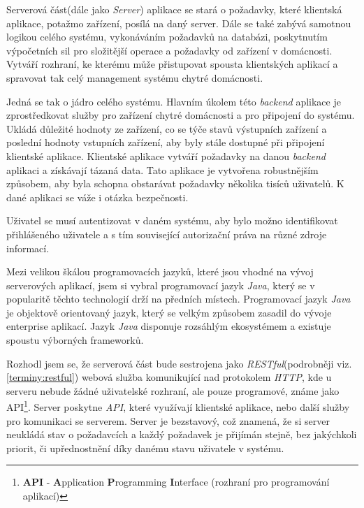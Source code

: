 Serverová část(dále jako \emph{Server}) aplikace se stará o požadavky, které klientská aplikace, potažmo zařízení, posílá na daný server.
Dále se také zabývá samotnou logikou celého systému, vykonáváním požadavků na databázi, poskytnutím výpočetních sil pro složitější operace a požadavky od zařízení v domácnosti.
Vytváří rozhraní, ke kterému může přistupovat spousta klientských aplikací a spravovat tak celý management systému chytré domácnosti.

Jedná se tak o jádro celého systému.
Hlavním úkolem této \emph{backend} aplikace je zprostředkovat služby pro zařízení chytré domácnosti a pro připojení do systému.
Ukládá důležité hodnoty ze zařízení, co se týče stavů výstupních zařízení a poslední hodnoty vstupních zařízení, aby byly stále dostupné při připojení klientské aplikace.
Klientské aplikace vytváří požadavky na danou \emph{backend} aplikaci a získávají tázaná data.
Tato aplikace je vytvořena robustnějším způsobem, aby byla schopna obstarávat požadavky několika tisíců uživatelů.
K dané aplikaci se váže i otázka bezpečnosti.

Uživatel se musí autentizovat v daném systému, aby bylo možno identifikovat přihlášeného uživatele a s tím související autorizační práva na různé zdroje informací.

Mezi velikou škálou programovacích jazyků, které jsou vhodné na vývoj serverových aplikací, jsem si vybral programovací jazyk \emph{Java},
který se v popularitě těchto technologií drží na předních místech. Programovací jazyk \emph{Java} je objektově orientovaný jazyk, který se velkým způsobem zasadil do vývoje enterprise aplikací.
Jazyk \emph{Java} disponuje rozsáhlým ekosystémem a existuje spoustu výborných frameworků.

Rozhodl jsem se, že serverová část bude sestrojena jako \emph{RESTful}(podrobněji viz. \ref{terminy:restful}) webová služba komunikující nad protokolem \emph{HTTP},
kde u serveru nebude žádné uživatelské rozhraní, ale pouze programové, známe jako API\footnote{\textbf{API} - \textbf{A}pplication \textbf{P}rogramming \textbf{I}nterface (rozhraní pro programování aplikací)}.
Server poskytne \emph{API}, které využívají klientské aplikace, nebo další služby pro komunikaci se serverem.
Server je bezstavový, což znamená, že si server neukládá stav o požadavcích a každý požadavek je přijímán stejně, bez jakýchkoli priorit, či upřednostnění díky danému stavu uživatele v systému.

